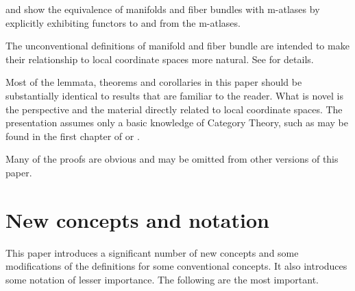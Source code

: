 \documentclass{article}
\begin{document}
 and  show the equivalence of
manifolds and fiber bundles with m-atlases by explicitly exhibiting
functors to and from the m-atlases.

\begin{remark}
The unconventional definitions of manifold and fiber bundle are intended
to make their relationship to local coordinate spaces more natural.
See \cite{LCS} for details.
\end{remark}

Most of the lemmata, theorems and corollaries in this paper should be
substantially identical to results that are familiar to the reader. What
is novel is the perspective and the material directly related to local
coordinate spaces. The presentation assumes only a basic knowledge of
Category Theory, such as may be found in the first chapter of
\cite{CftWM} or
{
  \showlabelsinline
  \cite{JoyCat}.
}

Many of the proofs are obvious and may be omitted from other versions of
this paper.

\section{New concepts and notation}
\label{sec:new}
This paper introduces a significant number of new concepts and some
modifications of the definitions for some conventional concepts. It also
introduces some notation of lesser importance.  The following are the
most important.
\end{document}
